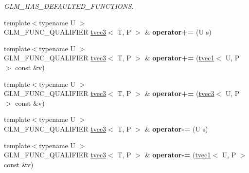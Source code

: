 \begin{DoxyCompactItemize}
\begin{DoxyCompactList}\small\item\em G\-L\-M\-\_\-\-H\-A\-S\-\_\-\-D\-E\-F\-A\-U\-L\-T\-E\-D\-\_\-\-F\-U\-N\-C\-T\-I\-O\-N\-S. \end{DoxyCompactList}\item 
\hypertarget{structglm_1_1tvec3_ab7b1901e86c5ba355d90dae68f286be6}{{\footnotesize template$<$typename U $>$ }\\G\-L\-M\-\_\-\-F\-U\-N\-C\-\_\-\-Q\-U\-A\-L\-I\-F\-I\-E\-R \hyperlink{structglm_1_1tvec3}{tvec3}$<$ T, P $>$ \& {\bfseries operator+=} (U s)}\label{structglm_1_1tvec3_ab7b1901e86c5ba355d90dae68f286be6}

\item 
\hypertarget{structglm_1_1tvec3_a26a3f96b23e7f5d59992c65a48dbb01d}{{\footnotesize template$<$typename U $>$ }\\G\-L\-M\-\_\-\-F\-U\-N\-C\-\_\-\-Q\-U\-A\-L\-I\-F\-I\-E\-R \hyperlink{structglm_1_1tvec3}{tvec3}$<$ T, P $>$ \& {\bfseries operator+=} (\hyperlink{structglm_1_1tvec1}{tvec1}$<$ U, P $>$ const \&v)}\label{structglm_1_1tvec3_a26a3f96b23e7f5d59992c65a48dbb01d}

\item 
\hypertarget{structglm_1_1tvec3_a8c4047ef94643db0f346827041366fd2}{{\footnotesize template$<$typename U $>$ }\\G\-L\-M\-\_\-\-F\-U\-N\-C\-\_\-\-Q\-U\-A\-L\-I\-F\-I\-E\-R \hyperlink{structglm_1_1tvec3}{tvec3}$<$ T, P $>$ \& {\bfseries operator+=} (\hyperlink{structglm_1_1tvec3}{tvec3}$<$ U, P $>$ const \&v)}\label{structglm_1_1tvec3_a8c4047ef94643db0f346827041366fd2}

\item 
\hypertarget{structglm_1_1tvec3_a7ce4caafdbf9b31201cbe7018f85fa90}{{\footnotesize template$<$typename U $>$ }\\G\-L\-M\-\_\-\-F\-U\-N\-C\-\_\-\-Q\-U\-A\-L\-I\-F\-I\-E\-R \hyperlink{structglm_1_1tvec3}{tvec3}$<$ T, P $>$ \& {\bfseries operator-\/=} (U s)}\label{structglm_1_1tvec3_a7ce4caafdbf9b31201cbe7018f85fa90}

\item 
\hypertarget{structglm_1_1tvec3_a5faeb262b3d7bdc7c56fbb582ef6ee5a}{{\footnotesize template$<$typename U $>$ }\\G\-L\-M\-\_\-\-F\-U\-N\-C\-\_\-\-Q\-U\-A\-L\-I\-F\-I\-E\-R \hyperlink{structglm_1_1tvec3}{tvec3}$<$ T, P $>$ \& {\bfseries operator-\/=} (\hyperlink{structglm_1_1tvec1}{tvec1}$<$ U, P $>$ const \&v)}\label{structglm_1_1tvec3_a5faeb262b3d7bdc7c56fbb582ef6ee5a}


\end{DoxyCompactItemize}
